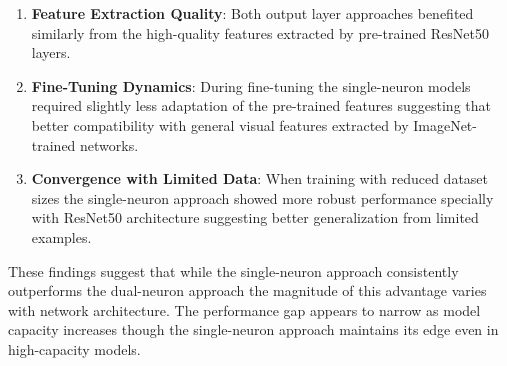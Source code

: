 \begin{enumerate}
\item \textbf{Feature Extraction Quality}: Both output layer approaches benefited similarly from the high-quality features extracted by pre-trained ResNet50 layers.

\item \textbf{Fine-Tuning Dynamics}: During fine-tuning the single-neuron models required slightly less adaptation of the pre-trained features suggesting that better compatibility with general visual features extracted by ImageNet-trained networks.

\item \textbf{Convergence with Limited Data}: When training with reduced dataset sizes the single-neuron approach showed more robust performance specially with ResNet50 architecture suggesting better generalization from limited examples.
\end{enumerate}

These findings suggest that while the single-neuron approach consistently outperforms the dual-neuron approach the magnitude of this advantage varies with network architecture. The performance gap appears to narrow as model capacity increases though the single-neuron approach maintains its edge even in high-capacity models.
